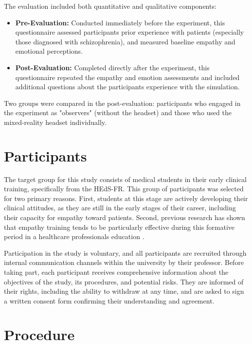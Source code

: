 \vspace{1em}

The evaluation included both quantitative and qualitative components:

\begin{itemize}
  \item \textbf{Pre-Evaluation:} Conducted immediately before the experiment, this questionnaire assessed participants prior experience with patients (especially those diagnosed with schizophrenia), and measured baseline empathy and emotional perceptions.
  \item \textbf{Post-Evaluation:} Completed directly after the experiment, this questionnaire repeated the empathy and emotion assessments and included additional questions about the participants experience with the simulation.
\end{itemize}

Two groups were compared in the post-evaluation: participants who engaged in the experiment as "observers" (without the headset) and those who used the mixed-reality headset individually.


\section{Participants}

The target group for this study consists of medical students in their early clinical training, specifically from the HEdS-FR. This group of participants was selected for two primary reasons. First, students at this stage are actively developing their clinical attitudes, as they are still in the early stages of their career, including their capacity for empathy toward patients. Second, previous research has shown that empathy training tends to be particularly effective during this formative period in a healthcare professionals education \cite{Hsia2022, Kuhail2022}.

\vspace{1em}

Participation in the study is voluntary, and all participants are recruited through internal communication channels within the university by their professor. Before taking part, each participant receives comprehensive information about the objectives of the study, its procedures, and potential risks. They are informed of their rights, including the ability to withdraw at any time, and are asked to sign a written consent form confirming their understanding and agreement.


\section{Procedure}

